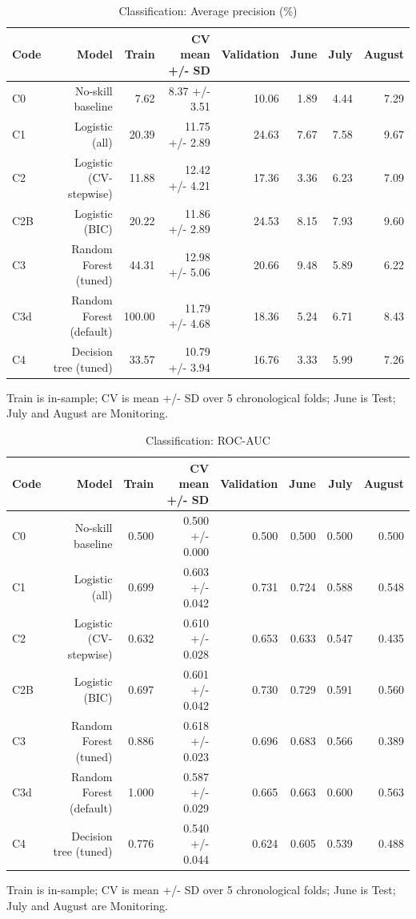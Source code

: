 \begin{table}[htbp]
\centering
\small
\caption{Classification: Average precision (\%)}
\begin{tabular}{lrrrrrrr}
\toprule
Code & Model & Train & CV mean +/- SD & Validation & June & July & August \\
\midrule
C0 & No-skill baseline & 7.62 & 8.37 +/- 3.51 & 10.06 & 1.89 & 4.44 & 7.29 \\
C1 & Logistic (all) & 20.39 & 11.75 +/- 2.89 & 24.63 & 7.67 & 7.58 & 9.67 \\
C2 & Logistic (CV-stepwise) & 11.88 & 12.42 +/- 4.21 & 17.36 & 3.36 & 6.23 & 7.09 \\
C2B & Logistic (BIC) & 20.22 & 11.86 +/- 2.89 & 24.53 & 8.15 & 7.93 & 9.60 \\
C3 & Random Forest (tuned) & 44.31 & 12.98 +/- 5.06 & 20.66 & 9.48 & 5.89 & 6.22 \\
C3d & Random Forest (default) & 100.00 & 11.79 +/- 4.68 & 18.36 & 5.24 & 6.71 & 8.43 \\
C4 & Decision tree (tuned) & 33.57 & 10.79 +/- 3.94 & 16.76 & 3.33 & 5.99 & 7.26 \\
\bottomrule
\end{tabular}
\par\smallskip\begin{minipage}{\linewidth}\footnotesize Train is in-sample; CV is mean +/- SD over 5 chronological folds; June is Test; July and August are Monitoring.\end{minipage}
\end{table}


\begin{table}[htbp]
\centering
\small
\caption{Classification: ROC-AUC}
\begin{tabular}{lrrrrrrr}
\toprule
Code & Model & Train & CV mean +/- SD & Validation & June & July & August \\
\midrule
C0 & No-skill baseline & 0.500 & 0.500 +/- 0.000 & 0.500 & 0.500 & 0.500 & 0.500 \\
C1 & Logistic (all) & 0.699 & 0.603 +/- 0.042 & 0.731 & 0.724 & 0.588 & 0.548 \\
C2 & Logistic (CV-stepwise) & 0.632 & 0.610 +/- 0.028 & 0.653 & 0.633 & 0.547 & 0.435 \\
C2B & Logistic (BIC) & 0.697 & 0.601 +/- 0.042 & 0.730 & 0.729 & 0.591 & 0.560 \\
C3 & Random Forest (tuned) & 0.886 & 0.618 +/- 0.023 & 0.696 & 0.683 & 0.566 & 0.389 \\
C3d & Random Forest (default) & 1.000 & 0.587 +/- 0.029 & 0.665 & 0.663 & 0.600 & 0.563 \\
C4 & Decision tree (tuned) & 0.776 & 0.540 +/- 0.044 & 0.624 & 0.605 & 0.539 & 0.488 \\
\bottomrule
\end{tabular}
\par\smallskip\begin{minipage}{\linewidth}\footnotesize Train is in-sample; CV is mean +/- SD over 5 chronological folds; June is Test; July and August are Monitoring.\end{minipage}
\end{table}


